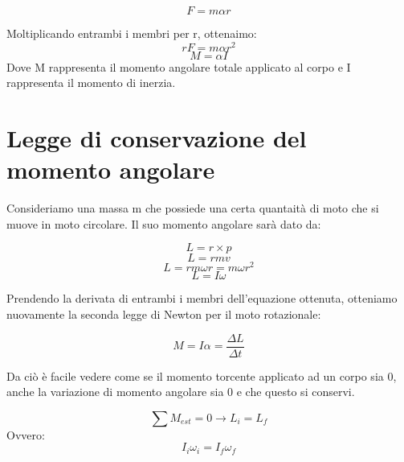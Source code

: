 \documentclass[10pt,a4paper]{article}
\begin{document}
$$F=m \alpha r$$

Moltiplicando entrambi i membri per r, ottenaimo:
$$r F = m \alpha r^2$$
$$M = \alpha I$$
Dove M rappresenta il momento angolare totale applicato al corpo e I rappresenta il momento di inerzia.

\section{Legge di conservazione del momento angolare}

Consideriamo una massa m che possiede una certa quantaità di moto che si muove in moto circolare. Il suo momento angolare sarà dato da:

$$	L = r \times p $$
$$	L = rmv $$
$$	L = rm \omega r = m \omega r^2 $$
$$	L = I \omega $$

Prendendo la derivata di entrambi i membri dell'equazione ottenuta, otteniamo nuovamente la seconda legge di Newton per il moto rotazionale:

$$M = I \alpha = \frac{\Delta L}{\Delta t}$$

Da ciò è facile vedere come se il momento torcente applicato ad un corpo sia 0, anche la variazione di momento angolare sia 0 e che questo si conservi.

\begin{definition}
	\begin{equation}
	\sum M_{est} = 0 \rightarrow L_i = L_f
	\end{equation}
	Ovvero:
	\begin{equation}
		I_i \omega_i = I_f \omega_f
	\end{equation}
\end{definition}
\end{document}
